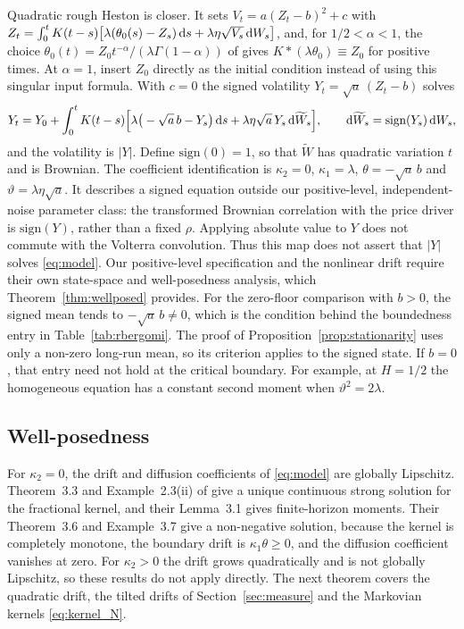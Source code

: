 Quadratic rough Heston is closer. It sets $V_t=a(Z_t-b)^2+c$ with $Z_t=\int_0^tK(t-s)\big[\lambda(\theta_0(s)-Z_s)\,\mathrm{d} s+\lambda\eta\sqrt{V_s}\,\mathrm{d} W_s\big]$, and, for $1/2<\alpha<1$, the choice $\theta_0(t)=Z_0t^{-\alpha}/(\lambda\Gamma(1-\alpha))$ of \citet{GatheralJusselinRosenbaum2020} gives $K*(\lambda\theta_0)\equiv Z_0$ for positive times. At $\alpha=1$, insert $Z_0$ directly as the initial condition instead of using this singular input formula. With $c=0$ the signed volatility $Y_t=\sqrt a\,(Z_t-b)$ solves
\begin{equation}\label{eq:qrh_map}
Y_t=Y_0+\int_0^tK(t-s)\Big[\lambda\big(-\sqrt a\,b-Y_s\big)\,\D s+\lambda\eta\sqrt a\,Y_s\,\D\widetilde W_s\Big],\qquad \D\widetilde W_s=\mathrm{sign}(Y_s)\,\D W_s,
\end{equation}
and the volatility is $|Y|$. Define $\mathrm{sign}(0)=1$, so that $\widetilde W$ has quadratic variation $t$ and is Brownian. The coefficient identification is $\kappa_2=0$, $\kappa_1=\lambda$, $\theta=-\sqrt a\,b$ and $\vartheta=\lambda\eta\sqrt a$. It describes a signed equation outside our positive-level, independent-noise parameter class: the transformed Brownian correlation with the price driver is $\mathrm{sign}(Y)$, rather than a fixed $\rho$. Applying absolute value to $Y$ does not commute with the Volterra convolution. Thus this map does not assert that $|Y|$ solves \eqref{eq:model}. Our positive-level specification and the nonlinear drift require their own state-space and well-posedness analysis, which Theorem~\ref{thm:wellposed} provides. For the zero-floor comparison with $b>0$, the signed mean tends to $-\sqrt a\,b\ne0$, which is the condition behind the boundedness entry in Table~\ref{tab:rbergomi}. The proof of Proposition~\ref{prop:stationarity} uses only a non-zero long-run mean, so its criterion applies to the signed state. If $b=0$, that entry need not hold at the critical boundary. For example, at $H=1/2$ the homogeneous equation has a constant second moment when $\vartheta^2=2\lambda$.

\subsection{Well-posedness}

For $\kappa_2=0$, the drift and diffusion coefficients of \eqref{eq:model} are globally Lipschitz. Theorem~3.3 and Example~2.3(ii) of \citet{AbiJaberLarssonPulido2019} give a unique continuous strong solution for the fractional kernel, and their Lemma~3.1 gives finite-horizon moments. Their Theorem~3.6 and Example~3.7 give a non-negative solution, because the kernel is completely monotone, the boundary drift is $\kappa_1\theta\ge0$, and the diffusion coefficient vanishes at zero. For $\kappa_2>0$ the drift grows quadratically and is not globally Lipschitz, so these results do not apply directly. The next theorem covers the quadratic drift, the tilted drifts of Section~\ref{sec:measure} and the Markovian kernels \eqref{eq:kernel_N}.

